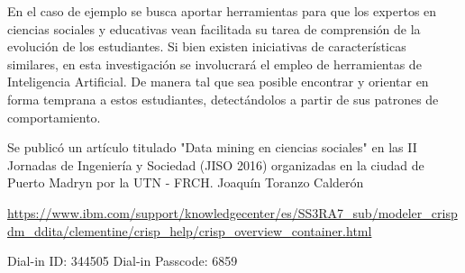 En el caso de ejemplo se busca aportar herramientas para que los expertos en ciencias sociales y educativas vean facilitada su tarea de comprensión de la evolución de los estudiantes. Si bien existen iniciativas de características similares, en esta investigación se involucrará el empleo de herramientas de Inteligencia Artificial. De manera tal que sea posible encontrar y orientar en forma temprana a estos estudiantes, detectándolos a partir de sus patrones de comportamiento.


Se publicó un artículo titulado "Data mining en ciencias sociales"
en las II Jornadas de Ingeniería y Sociedad (JISO 2016)
organizadas en la ciudad de Puerto Madryn por la UTN - FRCH.
Joaquín Toranzo Calderón

\hyperref[crisp-dm]{https://www.ibm.com/support/knowledgecenter/es/SS3RA7_sub/modeler_crispdm_ddita/clementine/crisp_help/crisp_overview_container.html}




Dial-in ID: 344505
Dial-in Passcode: 6859
